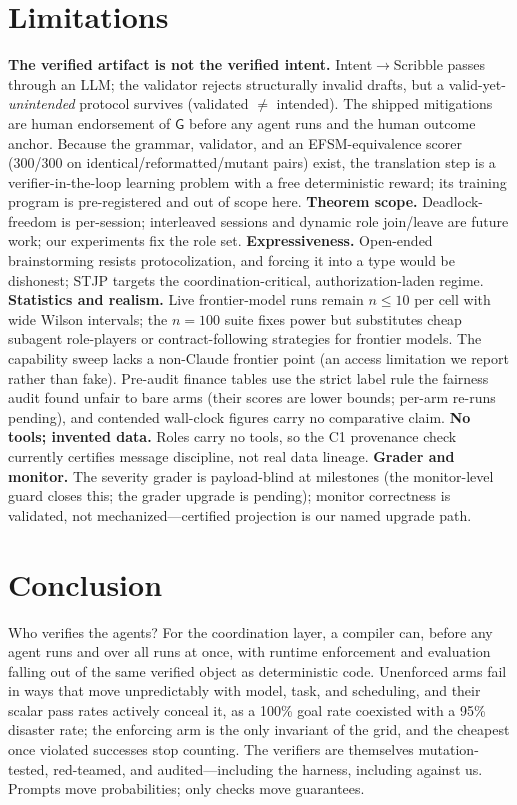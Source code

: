 \documentclass{article}
\newcommand{\gtG}{\mathsf{G}}
\newcommand{\stjp}{\textsc{STJP}}
\begin{document}
\section{Limitations}\label{sec:limits}
\textbf{The verified artifact is not the verified intent.} Intent$\to$Scribble passes through an LLM; the validator rejects structurally invalid drafts, but a valid-yet-\emph{unintended} protocol survives (validated $\neq$ intended). The shipped mitigations are human endorsement of $\gtG$ before any agent runs and the human outcome anchor. Because the grammar, validator, and an EFSM-equivalence scorer (300/300 on identical/reformatted/mutant pairs) exist, the translation step is a verifier-in-the-loop learning problem with a free deterministic reward; its training program is pre-registered and out of scope here. \textbf{Theorem scope.} Deadlock-freedom is per-session; interleaved sessions and dynamic role join/leave \citep{denielou11} are future work; our experiments fix the role set. \textbf{Expressiveness.} Open-ended brainstorming resists protocolization, and forcing it into a type would be dishonest; \stjp{} targets the coordination-critical, authorization-laden regime. \textbf{Statistics and realism.} Live frontier-model runs remain $n{\leq}10$ per cell with wide Wilson intervals; the $n{=}100$ suite fixes power but substitutes cheap subagent role-players or contract-following strategies for frontier models. The capability sweep lacks a non-Claude frontier point (an access limitation we report rather than fake). Pre-audit finance tables use the strict label rule the fairness audit found unfair to bare arms (their scores are lower bounds; per-arm re-runs pending), and contended wall-clock figures carry no comparative claim. \textbf{No tools; invented data.} Roles carry no tools, so the C1 provenance check currently certifies message discipline, not real data lineage. \textbf{Grader and monitor.} The severity grader is payload-blind at milestones (the monitor-level guard closes this; the grader upgrade is pending); monitor correctness is validated, not mechanized---certified projection \citep{liwies25} is our named upgrade path.

\section{Conclusion}
Who verifies the agents? For the coordination layer, a compiler can, before any agent runs and over all runs at once, with runtime enforcement and evaluation falling out of the same verified object as deterministic code. Unenforced arms fail in ways that move unpredictably with model, task, and scheduling, and their scalar pass rates actively conceal it, as a 100\% goal rate coexisted with a 95\% disaster rate; the enforcing arm is the only invariant of the grid, and the cheapest once violated successes stop counting. The verifiers are themselves mutation-tested, red-teamed, and audited---including the harness, including against us. Prompts move probabilities; only checks move guarantees.
\end{document}
